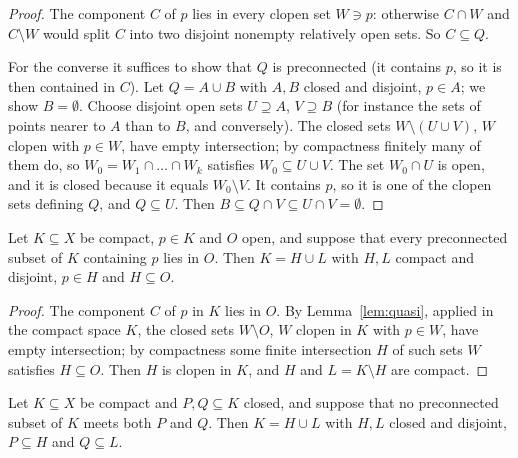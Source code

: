 \begin{proof}
The component $C$ of $p$ lies in every clopen set $W\ni p$: otherwise $C\cap W$ and $C\setminus W$
would split $C$ into two disjoint nonempty relatively open sets. So $C\subseteq Q$.

For the converse it suffices to show that $Q$ is preconnected (it contains $p$, so it is then
contained in $C$). Let $Q=A\cup B$ with $A,B$ closed and disjoint, $p\in A$; we show $B=\emptyset$.
Choose disjoint open sets $U\supseteq A$, $V\supseteq B$ (for instance the sets of points nearer to
$A$ than to $B$, and conversely). The closed sets $W\setminus(U\cup V)$, $W$ clopen with $p\in W$, have
empty intersection; by compactness finitely many of them do, so $W_0=W_1\cap\dots\cap W_k$
satisfies $W_0\subseteq U\cup V$. The set $W_0\cap U$ is open, and it is closed because it equals
$W_0\setminus V$. It contains $p$, so it is one of the clopen sets defining $Q$, and $Q\subseteq U$.
Then $B\subseteq Q\cap V\subseteq U\cap V=\emptyset$.
\end{proof}


\begin{lemma}\label{lem:clopen-split}
Let $K\subseteq X$ be compact, $p\in K$ and $O$ open, and suppose that every preconnected subset of
$K$ containing $p$ lies in $O$. Then $K=H\cup L$ with $H,L$ compact and disjoint, $p\in H$ and
$H\subseteq O$.
\end{lemma}

\begin{proof}
The component $C$ of $p$ in $K$ lies in $O$. By Lemma~\ref{lem:quasi}, applied in the compact space
$K$, the closed sets $W\setminus O$, $W$ clopen in $K$ with $p\in W$, have empty intersection; by
compactness some finite intersection $H$ of such sets $W$ satisfies $H\subseteq O$. Then $H$ is
clopen in $K$, and $H$ and $L=K\setminus H$ are compact.
\end{proof}


\begin{theorem}\label{thm:closed-split}
Let $K\subseteq X$ be compact and $P,Q\subseteq K$ closed, and suppose that no preconnected subset of
$K$ meets both $P$ and $Q$. Then $K=H\cup L$ with $H,L$ closed and disjoint, $P\subseteq H$ and
$Q\subseteq L$.
\end{theorem}


